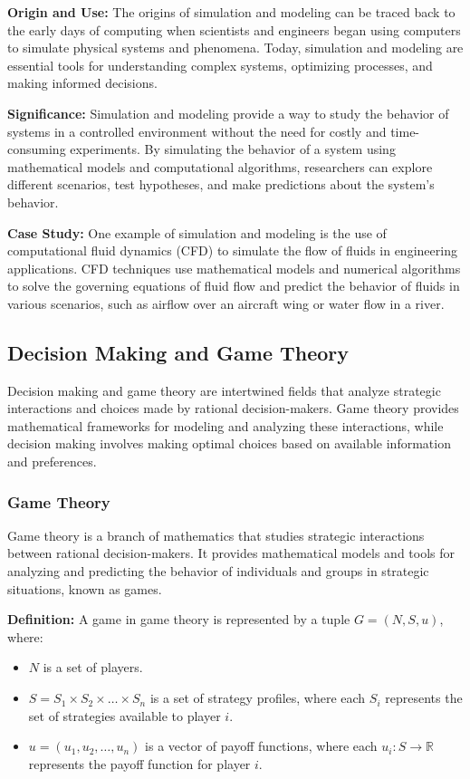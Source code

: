 \documentclass[12pt]{book} %
\begin{document}
\textbf{Origin and Use:} The origins of simulation and modeling can be traced back to the early days of computing when scientists and engineers began using computers to simulate physical systems and phenomena. Today, simulation and modeling are essential tools for understanding complex systems, optimizing processes, and making informed decisions.

\textbf{Significance:} Simulation and modeling provide a way to study the behavior of systems in a controlled environment without the need for costly and time-consuming experiments. By simulating the behavior of a system using mathematical models and computational algorithms, researchers can explore different scenarios, test hypotheses, and make predictions about the system's behavior.

\textbf{Case Study:} One example of simulation and modeling is the use of computational fluid dynamics (CFD) to simulate the flow of fluids in engineering applications. CFD techniques use mathematical models and numerical algorithms to solve the governing equations of fluid flow and predict the behavior of fluids in various scenarios, such as airflow over an aircraft wing or water flow in a river.

\subsection{Decision Making and Game Theory}

Decision making and game theory are intertwined fields that analyze strategic interactions and choices made by rational decision-makers. Game theory provides mathematical frameworks for modeling and analyzing these interactions, while decision making involves making optimal choices based on available information and preferences.

\subsubsection{Game Theory}

Game theory is a branch of mathematics that studies strategic interactions between rational decision-makers. It provides mathematical models and tools for analyzing and predicting the behavior of individuals and groups in strategic situations, known as games.

\textbf{Definition:} A game in game theory is represented by a tuple \(G = (N, S, u)\), where:
\begin{itemize}
    \item \(N\) is a set of players.
    \item \(S = S_1 \times S_2 \times \dots \times S_n\) is a set of strategy profiles, where each \(S_i\) represents the set of strategies available to player \(i\).
    \item \(u = (u_1, u_2, \dots, u_n)\) is a vector of payoff functions, where each \(u_i: S \rightarrow \mathbb{R}\) represents the payoff function for player \(i\).
\end{itemize}
\end{document}

